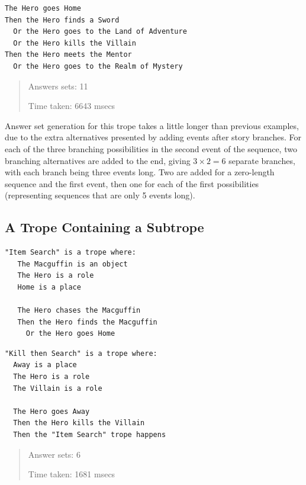 \documentclass[11pt]{report}
\begin{document}
\begin{lstlisting}[label={lst:ex-branch3}, caption={A combination of branches and sequences}]
The Hero goes Home
Then the Hero finds a Sword
  Or the Hero goes to the Land of Adventure
  Or the Hero kills the Villain
Then the Hero meets the Mentor
  Or the Hero goes to the Realm of Mystery
\end{lstlisting}

\begin{quote}
  Answers sets: 11

  Time taken: 6643 msecs
\end{quote}

Answer set generation for this trope takes a little longer than previous
examples, due to the extra alternatives presented by adding events after story
branches. For each of the three branching possibilities in the second event of
the sequence, two branching alternatives are added to the end, giving $3 \times 2 =
6$ separate branches, with each branch being three events long. Two are added
for a zero-length sequence and the first event, then one for each of the first
possibilities (representing sequences that are only 5 events long).

\subsection{A Trope Containing a Subtrope}
\begin{lstlisting}[showstringspaces=false, label={lst:ex-subtrope1}, caption={Subtrope
to be embedded}]
"Item Search" is a trope where:
   The Macguffin is an object
   The Hero is a role
   Home is a place

   The Hero chases the Macguffin
   Then the Hero finds the Macguffin
     Or the Hero goes Home
\end{lstlisting}


\begin{lstlisting}[showstringspaces=false, label={lst:ex-subtrope2}, caption={Trope containing a subtrope}]
"Kill then Search" is a trope where:
  Away is a place
  The Hero is a role
  The Villain is a role

  The Hero goes Away
  Then the Hero kills the Villain
  Then the "Item Search" trope happens
\end{lstlisting}

\begin{quote}
  Answer sets: 6

  Time taken: 1681 msecs
\end{quote}
\end{document}
